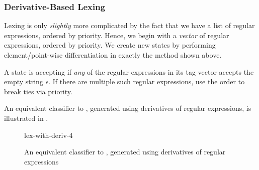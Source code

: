 \subsubsection{Derivative-Based Lexing}
Lexing is only \emph{slightly} more complicated by the fact that we have a list of regular expressions, ordered by priority. Hence, we begin with a \emph{vector} of regular expressions, ordered by priority. We create new states by performing element/point-wise differentiation in exactly the method shown above. 

A state is accepting if \textit{any} of the regular expressions in its tag vector accepts the empty string $\epsilon$. If there are multiple such regular expressions, use the order to break ties via priority.

An equivalent classifier to , generated using derivatives of regular expressions, is illustrated in .

\begin{figure}[H]
    \centering
    {lex-with-deriv-4}
    \caption{An equivalent classifier to , generated using derivatives of regular expressions}
    \label{fig:lex-with-deriv}
\end{figure}